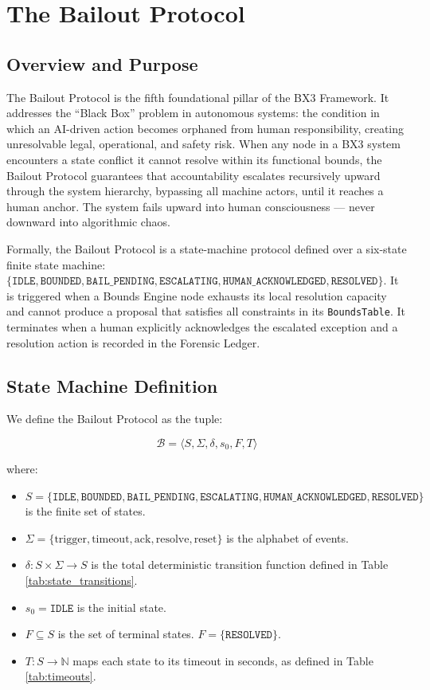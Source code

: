 \section{The Bailout Protocol}
\label{sec:bailout}

\subsection{Overview and Purpose}

The Bailout Protocol is the fifth foundational pillar of the BX3 Framework. It addresses the ``Black Box'' problem in autonomous systems: the condition in which an AI-driven action becomes orphaned from human responsibility, creating unresolvable legal, operational, and safety risk. When any node in a BX3 system encounters a state conflict it cannot resolve within its functional bounds, the Bailout Protocol guarantees that accountability escalates recursively upward through the system hierarchy, bypassing all machine actors, until it reaches a human anchor. The system fails upward into human consciousness --- never downward into algorithmic chaos.

Formally, the Bailout Protocol is a state-machine protocol defined over a six-state finite state machine: $\{\texttt{IDLE}, \texttt{BOUNDED}, \texttt{BAIL\_PENDING}, \texttt{ESCALATING}, \texttt{HUMAN\_ACKNOWLEDGED}, \texttt{RESOLVED}\}$. It is triggered when a Bounds Engine node exhausts its local resolution capacity and cannot produce a proposal that satisfies all constraints in its \texttt{BoundsTable}. It terminates when a human explicitly acknowledges the escalated exception and a resolution action is recorded in the Forensic Ledger.

\subsection{State Machine Definition}

We define the Bailout Protocol as the tuple:

\[
\mathcal{B} = \langle S, \Sigma, \delta, s_0, F, T \rangle
\]

where:

\begin{itemize}
    \item $S = \{\texttt{IDLE}, \texttt{BOUNDED}, \texttt{BAIL\_PENDING}, \texttt{ESCALATING}, \texttt{HUMAN\_ACKNOWLEDGED}, \texttt{RESOLVED}\}$ is the finite set of states.
    \item $\Sigma = \{\text{trigger}, \text{timeout}, \text{ack}, \text{resolve}, \text{reset}\}$ is the alphabet of events.
    \item $\delta: S \times \Sigma \rightarrow S$ is the total deterministic transition function defined in Table \ref{tab:state_transitions}.
    \item $s_0 = \texttt{IDLE}$ is the initial state.
    \item $F \subseteq S$ is the set of terminal states. $F = \{\texttt{RESOLVED}\}$.
    \item $T: S \rightarrow \mathbb{N}$ maps each state to its timeout in seconds, as defined in Table \ref{tab:timeouts}.
\end{itemize}


